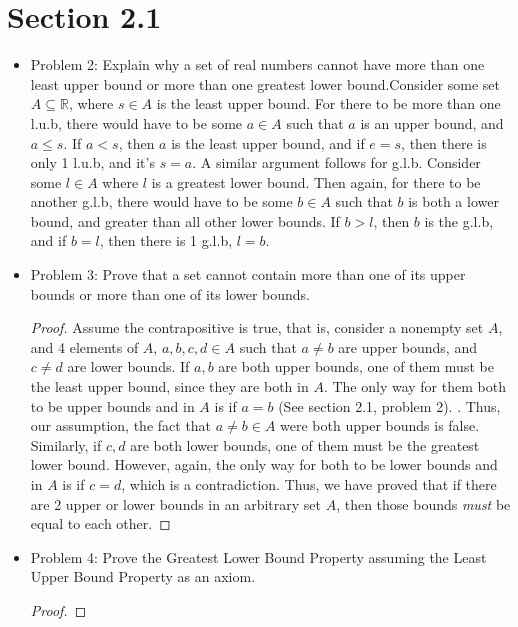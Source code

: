 \documentclass[hidelinks,12pt]{article}
\title{\scalebox{2}{Math 551 Homework 1}}
\author{\scalebox{1.5}{Theo Koss}}
\date{September 2021}
\theoremstyle{definition}
\let\marvosymLightning\Lightning
\renewcommand{\Lightning}{\scalebox{1.5}{\marvosymLightning}}
\newcommand{\R}{\mathbb{R}}
\begin{document}
\maketitle
\section{Section 2.1}
\begin{itemize}
\item Problem 2: Explain why a set of real numbers cannot have more than one least upper bound or more than one greatest lower bound.\newline Consider some set $A\subseteq\R$, where $s\in A$ is the least upper bound. For there to be more than one l.u.b, there would have to be some $a\in A$ such that $a$ is an upper bound, and $a\leq s$. If $a<s$, then $a$ is the least upper bound, and if $e=s$, then there is only 1 l.u.b, and it's $s=a$.
\newline A similar argument follows for g.l.b. Consider some $l\in A$ where $l$ is a greatest lower bound. Then again, for there to be another g.l.b, there would have to be some $b\in A$ such that $b$ is both a lower bound, and greater than all other lower bounds. If $b>l$, then $b$ is the g.l.b, and if $b=l$, then there is 1 g.l.b, $l=b$.
\item Problem 3: Prove that a set cannot contain more than one of its upper bounds or more than one of its lower bounds.\begin{proof}
Assume the contrapositive is true, that is, consider a nonempty set $A$, and 4 elements of $A$, $a,b,c,d\in A$ such that $a\neq b$ are upper bounds, and $c\neq d$ are lower bounds. If $a,b$ are both upper bounds, one of them must be the least upper bound, since they are both in $A$. The only way for them both to be upper bounds and in $A$ is if $a=b$ (See section 2.1, problem 2). \Lightning. Thus, our assumption, the fact that $a\neq b\in A$ were both upper bounds is false. \newline Similarly, if $c,d$ are both lower bounds, one of them must be the greatest lower bound. However, again, the only way for both to be lower bounds and in $A$ is if $c=d$, which is a contradiction. Thus, we have proved that if there are 2 upper or lower bounds in an arbitrary set $A$, then those bounds \emph{must} be equal to each other.
\end{proof}
\item Problem 4: Prove the Greatest Lower Bound Property assuming the Least Upper Bound Property as an axiom.\begin{proof}

\end{proof}
\end{itemize}
\end{document}

